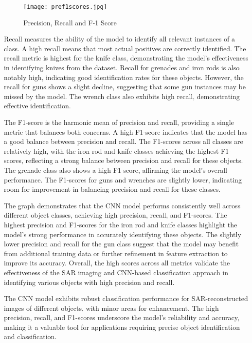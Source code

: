 \documentclass[journal,article,submit,pdftex,moreauthors]{Definitions/mdpi}
\begin{document}
\begin{figure}[h]
  \centering
  \texttt{[image: pref1scores.jpg]}
  \caption{Precision, Recall and F-1 Score}
  \label{Figure:}
\end{figure}



Recall measures the ability of the model to identify all relevant instances of a class. A high recall means that most actual positives are correctly identified. The recall metric is highest for the knife class, demonstrating the model's effectiveness in identifying knives from the dataset. Recall for grenades and iron rods is also notably high, indicating good identification rates for these objects. However, the recall for guns shows a slight decline, suggesting that some gun instances may be missed by the model. The wrench class also exhibits high recall, demonstrating effective identification.

The F1-score is the harmonic mean of precision and recall, providing a single metric that balances both concerns. A high F1-score indicates that the model has a good balance between precision and recall. The F1-scores across all classes are relatively high, with the iron rod and knife classes achieving the highest F1-scores, reflecting a strong balance between precision and recall for these objects. The grenade class also shows a high F1-score, affirming the model's overall performance. The F1-scores for guns and wrenches are slightly lower, indicating room for improvement in balancing precision and recall for these classes.

The graph demonstrates that the CNN model performs consistently well across different object classes, achieving high precision, recall, and F1-scores. The highest precision and F1-scores for the iron rod and knife classes highlight the model's strong performance in accurately identifying these objects. The slightly lower precision and recall for the gun class suggest that the model may benefit from additional training data or further refinement in feature extraction to improve its accuracy. Overall, the high scores across all metrics validate the effectiveness of the SAR imaging and CNN-based classification approach in identifying various objects with high precision and recall.

The CNN model exhibits robust classification performance for SAR-reconstructed images of different objects, with minor areas for enhancement. The high precision, recall, and F1-scores underscore the model's reliability and accuracy, making it a valuable tool for applications requiring precise object identification and classification.
\end{document}
